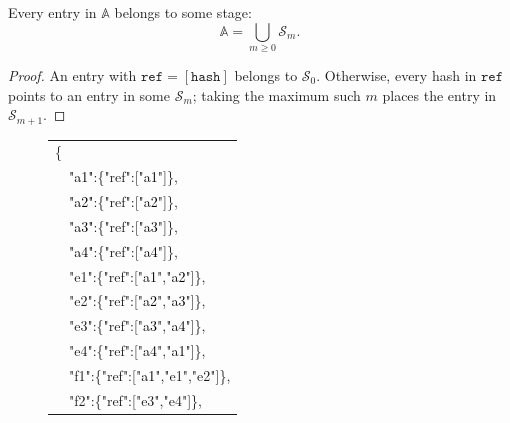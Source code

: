 \begin{lemma}
\label{lem:stage-exhaustion}
Every entry in $\mathbb{A}$ belongs to some stage:
\[
\mathbb{A} = \bigcup_{m \geq 0} \mathcal{S}_m.
\]
\end{lemma}

\begin{proof}
An entry with $\texttt{ref} = [\texttt{hash}]$ belongs to $\mathcal{S}_0$. Otherwise, every hash in $\texttt{ref}$ points to an entry in some $\mathcal{S}_m$; taking the maximum such $m$ places the entry in $\mathcal{S}_{m+1}$.
\end{proof}

\begin{figure}[ht]
\centering
\begin{minipage}[t]{0.48\textwidth}
\vspace{0pt}
\centering
\scalebox{1.5}{}
\end{minipage}%
\hspace{4pt}%
\begin{minipage}[t]{0.48\textwidth}
\vspace{0pt}
{\scriptsize\ttfamily
\begin{tabular}{@{}l@{}}
\{\\
\ \ \textcolor{black}{"a1"}:\{"ref":["\textcolor{black}{a1}"]\},\\
\ \ \textcolor{black}{"a2"}:\{"ref":["\textcolor{black}{a2}"]\},\\
\ \ \textcolor{black}{"a3"}:\{"ref":["\textcolor{black}{a3}"]\},\\
\ \ \textcolor{black}{"a4"}:\{"ref":["\textcolor{black}{a4}"]\},\\
\ \ \textcolor{blue!70!black}{"e1"}:\{"ref":["\textcolor{black}{a1}","\textcolor{black}{a2}"]\},\\
\ \ \textcolor{blue!70!black}{"e2"}:\{"ref":["\textcolor{black}{a2}","\textcolor{black}{a3}"]\},\\
\ \ \textcolor{blue!70!black}{"e3"}:\{"ref":["\textcolor{black}{a3}","\textcolor{black}{a4}"]\},\\
\ \ \textcolor{blue!70!black}{"e4"}:\{"ref":["\textcolor{black}{a4}","\textcolor{black}{a1}"]\},\\
\ \ \textcolor{red!70!black}{"f1"}:\{"ref":["\textcolor{black}{a1}","\textcolor{blue!70!black}{e1}","\textcolor{blue!70!black}{e2}"]\},\\
\ \ \textcolor{red!70!black}{"f2"}:\{"ref":["\textcolor{blue!70!black}{e3}","\textcolor{blue!70!black}{e4}"]\},\\

\end{tabular}}
\end{minipage}
\end{figure}
